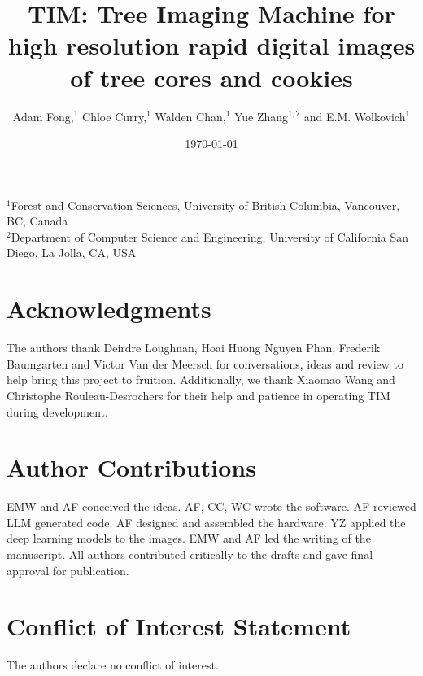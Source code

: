 \documentclass[a4paper,12pt]{article}
\title{TIM: Tree Imaging Machine for high resolution rapid digital images of tree cores and cookies}
\author{Adam Fong,$^{1}$ Chloe Curry,$^{1}$ Walden Chan,$^{1}$ Yue Zhang$^{1, 2}$ and E.M. Wolkovich$^{1}$} %
\date{\today}
\begin{document}
\linenumbers
\doublespacing

\maketitle

\noindent $^{1}$Forest and Conservation Sciences, University of British Columbia, Vancouver, BC, Canada\\
$^{2}$Department of Computer Science and Engineering, University of California San Diego, La Jolla, CA, USA\\ 

\section{Acknowledgments} %
The authors thank Deirdre Loughnan, Hoai Huong Nguyen Phan, Frederik Baumgarten and Victor Van der Meersch for conversations, ideas and review to help bring this project to fruition. Additionally, we thank Xiaomao Wang and Christophe Rouleau-Desrochers for their help and patience in operating TIM during development. 

\section{Author Contributions}
EMW and AF conceived the ideas. AF, CC, WC wrote the software. AF reviewed LLM generated code. AF designed and assembled the hardware. YZ applied the deep learning models to the images. EMW and AF led the writing of the manuscript. All authors contributed critically to the drafts and gave final approval for publication.

\section{Conflict of Interest Statement}
The authors declare no conflict of interest.
\end{document}
